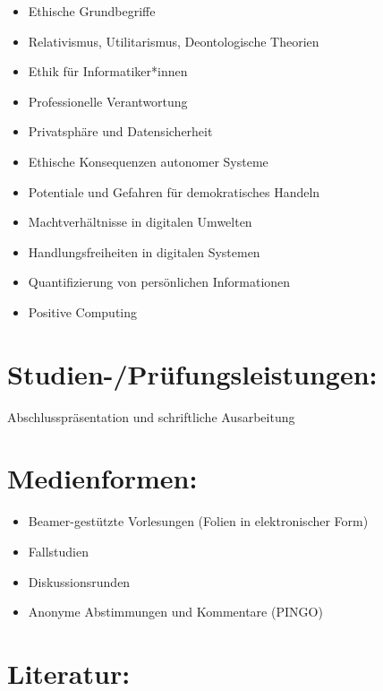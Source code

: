 \begin{itemize}
\item
  Ethische Grundbegriffe
\item
  Relativismus, Utilitarismus, Deontologische Theorien
\item
  Ethik für Informatiker*innen
\item
  Professionelle Verantwortung
\item
  Privatsphäre und Datensicherheit
\item
  Ethische Konsequenzen autonomer Systeme
\item
  Potentiale und Gefahren für demokratisches Handeln
\item
  Machtverhältnisse in digitalen Umwelten
\item
  Handlungsfreiheiten in digitalen Systemen
\item
  Quantifizierung von persönlichen Informationen
\item
  Positive Computing
\end{itemize}

\section*{Studien-/Prüfungsleistungen:}\label{studien-pruxfcfungsleistungen}

Abschlusspräsentation und schriftliche Ausarbeitung

\section*{Medienformen:}\label{medienformen}

\begin{itemize}
\item
  Beamer-gestützte Vorlesungen (Folien in elektronischer Form)
\item
  Fallstudien
\item
  Diskussionsrunden
\item
  Anonyme Abstimmungen und Kommentare (PINGO)
\end{itemize}

\section*{Literatur:}\label{literatur}

